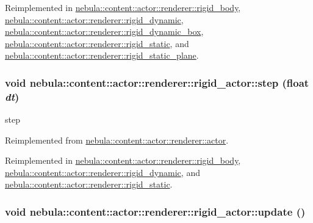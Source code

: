 Reimplemented in \hyperlink{classnebula_1_1content_1_1actor_1_1renderer_1_1rigid__body_a24b3051c9db06008d8698cc97eff21e0}{nebula::content::actor::renderer::rigid\_\-body}, \hyperlink{classnebula_1_1content_1_1actor_1_1renderer_1_1rigid__dynamic_a6c0f68639544063b7a7bf404fdbc1370}{nebula::content::actor::renderer::rigid\_\-dynamic}, \hyperlink{classnebula_1_1content_1_1actor_1_1renderer_1_1rigid__dynamic__box_a45f52d77d1f89e86d5ac3cd2d0beb4c0}{nebula::content::actor::renderer::rigid\_\-dynamic\_\-box}, \hyperlink{classnebula_1_1content_1_1actor_1_1renderer_1_1rigid__static_a33ba501805701c5069344a5126830898}{nebula::content::actor::renderer::rigid\_\-static}, and \hyperlink{classnebula_1_1content_1_1actor_1_1renderer_1_1rigid__static__plane_ac0d85518481b3d6fc0d15402c6878ed9}{nebula::content::actor::renderer::rigid\_\-static\_\-plane}.\hypertarget{classnebula_1_1content_1_1actor_1_1renderer_1_1rigid__actor_a4e0cda8bb08115a62cbb8363ac439608}{
\subsubsection[{step}]{\setlength{\rightskip}{0pt plus 5cm}void nebula::content::actor::renderer::rigid\_\-actor::step (float {\em dt})}}
\label{classnebula_1_1content_1_1actor_1_1renderer_1_1rigid__actor_a4e0cda8bb08115a62cbb8363ac439608}


step 

Reimplemented from \hyperlink{classnebula_1_1content_1_1actor_1_1renderer_1_1actor_ab35c8c44d2603c17f4822cdef8be93bf}{nebula::content::actor::renderer::actor}.

Reimplemented in \hyperlink{classnebula_1_1content_1_1actor_1_1renderer_1_1rigid__body_a5e76495c7870d3b88c5b32888f9fa504}{nebula::content::actor::renderer::rigid\_\-body}, \hyperlink{classnebula_1_1content_1_1actor_1_1renderer_1_1rigid__dynamic_a2ba4e3e381092c03c39d21248d635621}{nebula::content::actor::renderer::rigid\_\-dynamic}, and \hyperlink{classnebula_1_1content_1_1actor_1_1renderer_1_1rigid__static_a1423732157573e9276023a54471b3f3a}{nebula::content::actor::renderer::rigid\_\-static}.\hypertarget{classnebula_1_1content_1_1actor_1_1renderer_1_1rigid__actor_a650ae9b6164016a9180817d7b077326f}{
\subsubsection[{update}]{\setlength{\rightskip}{0pt plus 5cm}void nebula::content::actor::renderer::rigid\_\-actor::update ()}}
\label{classnebula_1_1content_1_1actor_1_1renderer_1_1rigid__actor_a650ae9b6164016a9180817d7b077326f}


